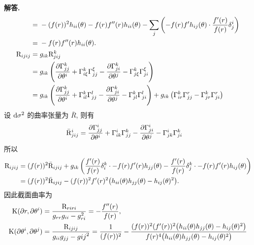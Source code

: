 \documentclass{ctexart}
\newenvironment{solution}{\par\noindent\textbf{解答. }}{\par}
\begin{document}
\begin{solution}
\[\begin{aligned}
            ={} & -(f(r))^2 h_{ii}(\theta) - f(r)f^{\prime\prime}(r) h_{ii}(\theta) - \sum_{j}\left(-f(r)f^\prime h_{ij}(\theta) \cdot \dfrac{f^\prime(r)}{f(r)}\delta^i_j\right) \\
            ={} & -f(r)f^{\prime\prime}(r) h_{ii}(\theta). \\
            \mathrm{R}_{ijij} = {} & g_{ik}\mathrm{R}^{k}_{jij} \\
            ={} & g_{ik}\left(\dfrac{\partial \Gamma^{k}_{j j}}{\partial \theta^i } + \Gamma^{k}_{i \xi}\Gamma^{\xi}_{j j} - \dfrac{\partial \Gamma^{k}_{j i }}{\partial \theta^j} - \Gamma^{k}_{j \xi}\Gamma^{\xi}_{j i}\right) \\
            ={} & g_{ik}\left(\dfrac{\partial \Gamma^{k}_{j j}}{\partial \theta^i } + \Gamma^{k}_{i l}\Gamma^{l}_{j j} - \dfrac{\partial \Gamma^{k}_{j i }}{\partial \theta^j} - \Gamma^{k}_{j l}\Gamma^{l}_{j i}\right) + g_{ik}\left( \Gamma^{k}_{i r}\Gamma^{r}_{j j} - \Gamma^{k}_{j r}\Gamma^{r}_{j i}\right)
        \end{aligned}
    \]
    设 $\mathop{}\!\mathrm{d} \sigma^2$ 的曲率张量为 $\bar{R}$, 则有
    \[
        \begin{aligned}
            \bar{\mathrm{R}}^{i}_{j i j} ={} & \dfrac{\partial \Gamma^{i}_{j j}}{\partial \theta^i } + \Gamma^{i}_{i k}\Gamma^{k}_{j j} - \dfrac{\partial \Gamma^{i}_{j i }}{\partial \theta^j} - \Gamma^{i}_{j k}\Gamma^{k}_{j i}
        \end{aligned}
    \]
    所以
    \[
        \begin{aligned}
            \mathrm{R}_{ijij} ={} & (f(r))^2\bar{\mathrm{R}}_{ijij} + g_{ik}\left( \dfrac{f^{\prime}(r)}{f(r)} \delta^k_{i} \cdot -f(r) f^{\prime}(r) h_{jj}(\theta) - \dfrac{f^{\prime}(r)}{f(r)} \delta^k_{j} \cdot -f(r) f^{\prime}(r) h_{ij}(\theta) \right) \\
            ={} & (f(r))^2\bar{\mathrm{R}}_{ijij} - (f(r))^2 f^{\prime}(r)^2 \bigl(h_{ii}(\theta) h_{jj}(\theta) - h_{ij}(\theta)^2\bigr).
        \end{aligned}
    \]
    因此截面曲率为
    \begin{equation}\label{eq::sectional-curvature}
        \begin{aligned}
        \K(\partial r, \partial \theta^i) ={} & \dfrac{\R_{riri}}{g_{rr} g_{ii} - g_{ri}^2} = -\dfrac{f^{\prime\prime}(r)}{f(r)}, \\
        \K(\partial \theta^i, \partial \theta^j) ={} & \dfrac{\R_{ijij}}{g_{ii} g_{jj} - g{ij}^2} = \dfrac{1}{(f(r))^2} - \dfrac{(f(r))^2 (f^{\prime}(r))^2 \bigl(h_{ii}(\theta) h_{jj}(\theta) - h_{ij}(\theta)^2\bigr)}{f(r)^4 \bigl(h_{ii}(\theta) h_{jj}(\theta) - h_{ij}(\theta)^2\bigr)} \\

\end{aligned}
\end{equation}
\end{solution}
\end{document}
